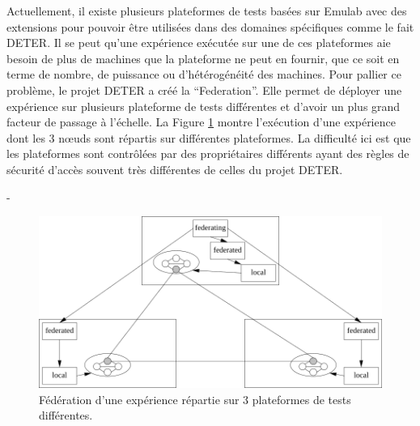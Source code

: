 Actuellement, il existe plusieurs plateformes de tests basées sur Emulab avec
des extensions pour pouvoir être utilisées dans des domaines spécifiques comme
le fait DETER. Il se peut qu'une expérience exécutée sur une de ces plateformes
aie besoin de plus de machines que la plateforme ne peut en fournir, que ce soit
en terme de nombre, de puissance ou d'hétérogénéité des machines. Pour pallier
ce problème, le projet DETER a créé la
``Federation''\citep{DETER_faber2007deter}. Elle permet de déployer une
expérience sur plusieurs plateforme de tests différentes et d'avoir un plus
grand facteur de passage à l'échelle. La Figure \ref{Federation} montre
l'exécution d'une expérience dont les 3 n\oe uds sont répartis sur différentes
plateformes. La difficulté ici est que les plateformes sont contrôlées par des
propriétaires différents ayant des règles de sécurité d'accès souvent très
différentes de celles du projet DETER.

-\begin{figure}
  \centering \includegraphics[scale=0.75]{Pictures/png/Deter_federation}
  \caption{Fédération d'une expérience répartie sur 3 plateformes de tests différentes.}
  \label{Federation}
\end{figure}

